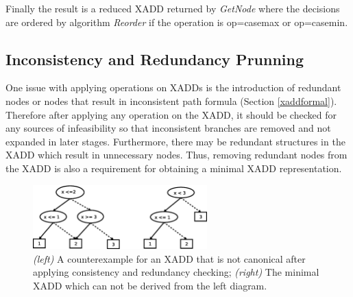 \documentclass[twoside,11pt]{article}
\begin{document}
Finally the result is a reduced XADD returned by \emph{GetNode} where the decisions are ordered by algorithm \emph{Reorder} if the operation is op=casemax or op=casemin. 

\subsection{Inconsistency and Redundancy Prunning}


One issue with applying operations on XADDs is the introduction of redundant nodes or nodes that result in inconsistent path formula (Section \ref{xaddformal}). Therefore after applying any operation on the XADD, it should be checked for any sources of infeasibility so that inconsistent branches are removed and not expanded in later stages. Furthermore, there may be redundant structures in the XADD which result in unnecessary nodes.
Thus, removing redundant nodes from the XADD is also a requirement for obtaining a minimal XADD representation. 

\begin{figure}[t!]
\centering
\includegraphics[width=0.6\textwidth]{FiguresSource/counterExample.eps} 
\caption{%
{\it (left)} A counterexample for an XADD that is not canonical after applying consistency and redundancy checking; {\it (right)}  The minimal XADD which can not be derived from the left diagram.} %
\label{fig:canonical}
\end{figure}
\end{document}
